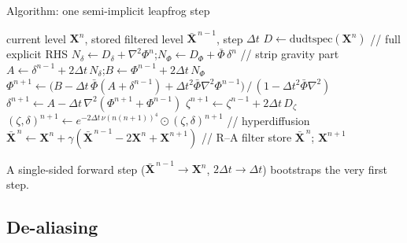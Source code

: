 \documentclass{beamer}
\begin{document}
\begin{frame}{Algorithm: one semi-implicit leapfrog step}
\begin{algorithm}[H]
\caption{Semi-implicit leapfrog $+$ Robert--Asselin (per step)}
\begin{algorithmic}[1]
    \REQUIRE current level $\mathbf X^{n}$, stored filtered level $\bar{\mathbf X}^{\,n-1}$, step $\Delta t$
    \STATE $D \leftarrow \text{dudtspec}(\mathbf X^{n})$ \hfill // full explicit RHS
    \STATE $N_\delta \leftarrow D_\delta + \nabla^2\Phi^{n}$;\quad $N_\Phi \leftarrow D_\Phi + \bar\Phi\,\delta^{n}$ \hfill // strip gravity part
    \STATE $A \leftarrow \delta^{n-1} + 2\Delta t\,N_\delta$;\quad $B \leftarrow \Phi^{n-1} + 2\Delta t\,N_\Phi$
    \STATE $\Phi^{n+1} \leftarrow \big(B - \Delta t\,\bar\Phi(A+\delta^{n-1}) + \Delta t^2\bar\Phi\nabla^2\Phi^{n-1}\big)\,/\,(1-\Delta t^2\bar\Phi\nabla^2)$
    \STATE $\delta^{n+1} \leftarrow A - \Delta t\,\nabla^2(\Phi^{n+1}+\Phi^{n-1})$
    \STATE $\zeta^{n+1} \leftarrow \zeta^{n-1} + 2\Delta t\,D_\zeta$
    \STATE $(\zeta,\delta)^{n+1} \leftarrow e^{-2\Delta t\,\nu(n(n+1))^4}\odot(\zeta,\delta)^{n+1}$ \hfill // hyperdiffusion
    \STATE $\bar{\mathbf X}^{\,n} \leftarrow \mathbf X^{n} + \gamma(\bar{\mathbf X}^{\,n-1} - 2\mathbf X^{n} + \mathbf X^{n+1})$ \hfill // R--A filter
    \STATE store $\bar{\mathbf X}^{\,n}$;\; \RETURN $\mathbf X^{n+1}$
\end{algorithmic}
\end{algorithm}
\footnotesize A single-sided forward step ($\bar{\mathbf X}^{\,n-1}\!\to\!\mathbf X^{n}$, $2\Delta t\!\to\!\Delta t$) bootstraps the very first step.
\end{frame}

\subsection{De-aliasing}
\end{document}
